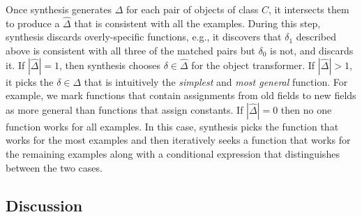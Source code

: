 \documentclass[natbib,10pt]{sigplanconf}
\newcommand{\kathryn}[1]{\textcolor{blue}{Kathryn: #1}}
\newcommand{\mwh}[1]{\textcolor{blue}{Mike: #1}}
\begin{document}
Once synthesis generates $\Delta$ for each pair of objects of class  $C$, it
intersects them to produce a $\hat{\Delta}$ that
is consistent with all the examples.  During this step, synthesis discards
overly-specific functions, e.g., it discovers that $\delta_1$
described above is consistent with 
all three of the matched pairs but $\delta_0$ is not, and
discards it.  If $|\hat{\Delta}| =
1$, then synthesis chooses $\delta \in \hat{\Delta}$ for the object transformer.  If
$|\hat{\Delta}| > 1$, it picks the $\delta \in \Delta$
that is intuitively the \emph{simplest} and \emph{most general}
function.  For example, we mark functions that contain assignments from old
fields to new fields as more general than functions that assign
constants.  If $|\hat{\Delta}| = 0$ then no one function
works for all examples.  In this case, synthesis picks the function that
works for the most examples and then iteratively seeks a function that
works for the remaining examples along with a conditional expression
that distinguishes between the two cases.





\subsection{Discussion}
\end{document}
